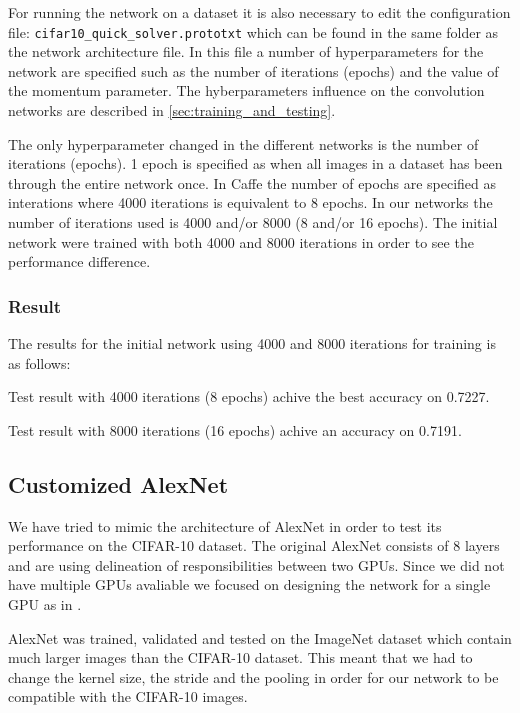 For running the network on a dataset it is also necessary to edit the
configuration file: \verb|cifar10_quick_solver.prototxt| which can be found in
the same folder as the network architecture file. In this file a number of
hyperparameters for the network are specified such as the number of iterations
(epochs) and the value of the momentum parameter. The hyberparameters influence
on the convolution networks are described in \autoref{sec:training_and_testing}.


The only hyperparameter changed in the different networks is the number of
iterations (epochs). 1 epoch is specified as when all images in a dataset has
been through the entire network once. In Caffe the number of epochs are
specified as interations where 4000 iterations is equivalent to 8 epochs. In
our networks the number of iterations used is 4000 and/or 8000 (8 and/or 16
epochs). The initial network were trained with both 4000 and 8000 iterations in
order to see the performance difference.  


\subsubsection{Result}

The results for the initial network using 4000 and 8000 iterations for training
is as follows: 

Test result with 4000 iterations (8 epochs) achive the best accuracy on 0.7227.   

Test result with 8000 iterations (16 epochs) achive an accuracy on 0.7191. 



\subsection{Customized AlexNet} %
\label{sub:alexNet}

We have tried to mimic the architecture of AlexNet\cite{AlexNet} in order
to test its performance on the CIFAR-10 dataset. The original AlexNet consists of 8
layers and are using delineation of responsibilities between two GPUs. Since we
did not have multiple GPUs avaliable we focused on designing the network for a
single GPU as in \cite{ZeilerFergus}. 

AlexNet was trained, validated and tested on the ImageNet dataset which contain
much larger images than the CIFAR-10 dataset. This meant that we had to change
the kernel size, the stride and the pooling in order for our network to be
compatible with the CIFAR-10 images. 


